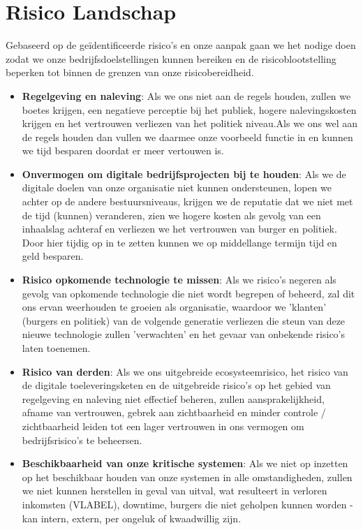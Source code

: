 \documentclass[11pt]{article}
\begin{document}
\section{Risico Landschap}
\label{sec:org366c8c9}
Gebaseerd op de geïdentificeerde risico's en onze aanpak gaan we het nodige doen zodat we onze bedrijfsdoelstellingen kunnen bereiken en de risicoblootstelling beperken tot binnen de grenzen van 
onze risicobereidheid.
\begin{itemize}
\item \textbf{Regelgeving en naleving}: Als we ons niet aan de regels houden, zullen we boetes krijgen, een negatieve perceptie bij het publiek, hogere nalevingskosten krijgen en het vertrouwen verliezen van het politiek niveau.Als we ons wel aan de regels houden dan vullen we daarmee onze voorbeeld functie in en kunnen we tijd besparen doordat er meer vertouwen is.
\item \textbf{Onvermogen om digitale bedrijfsprojecten bij te houden}: Als we de digitale doelen van onze organisatie niet kunnen ondersteunen, lopen we achter op de andere bestuursniveaus, krijgen we de reputatie dat we niet met de tijd (kunnen) veranderen, zien we hogere kosten als gevolg van een inhaalslag achteraf en verliezen we het vertrouwen van burger en politiek. Door hier tijdig op in te zetten kunnen we op middellange termijn tijd en geld besparen.
\item \textbf{Risico opkomende technologie te missen}: Als we risico's negeren als gevolg van opkomende technologie die niet wordt begrepen of beheerd, zal dit ons ervan weerhouden te groeien als organisatie, waardoor we 'klanten' (burgers en politiek) van de volgende generatie verliezen die steun van deze nieuwe technologie zullen 'verwachten' en het gevaar van onbekende risico's laten toenemen.
\item \textbf{Risico van derden}: Als we ons uitgebreide ecosysteemrisico, het risico van de digitale toeleveringsketen en de uitgebreide risico's op het gebied van regelgeving en naleving niet effectief beheren, zullen aansprakelijkheid, afname van vertrouwen, gebrek aan zichtbaarheid en minder controle / zichtbaarheid leiden tot een lager vertrouwen in ons vermogen om bedrijfsrisico's te beheersen.
\item \textbf{Beschikbaarheid van onze kritische systemen}: Als we niet op inzetten op het beschikbaar houden van onze systemen in alle omstandigheden, zullen we niet kunnen herstellen in geval van uitval, wat resulteert in verloren inkomsten (VLABEL), downtime, burgers die niet geholpen kunnen worden - kan intern, extern, per ongeluk of kwaadwillig zijn.
\end{itemize}
\end{document}
